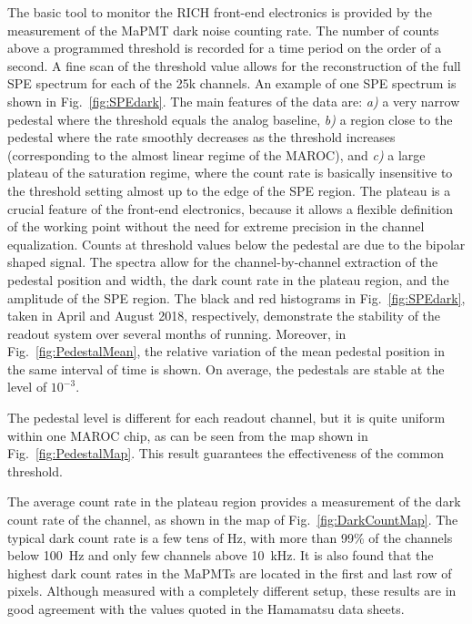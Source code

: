 \documentclass[5p,times,twocolumn]{elsarticle}
\begin{document}
The basic tool to monitor the RICH front-end electronics is provided by the measurement of the MaPMT dark noise
counting rate. The number of counts above a programmed
threshold is recorded for a time period on the order of a second. A fine scan of the threshold value allows for the
reconstruction of the full SPE spectrum for each of the 25k channels. An example of one SPE spectrum is shown in
Fig.~\ref{fig:SPEdark}. The main features of the data are: {\it{a)}} a very narrow pedestal where the threshold equals
the analog baseline,  {\it{b)}} a region close to the pedestal where the rate smoothly decreases as the threshold increases
(corresponding to the almost linear regime of the MAROC), and  {\it{c)}} a large plateau of the saturation regime, where
the count rate is basically insensitive to the threshold setting almost up to the edge of the SPE region. The plateau is a
crucial feature of the front-end electronics, because it allows a flexible definition of the working point without the need
for extreme precision in the channel equalization. Counts at threshold values below the pedestal are due to the bipolar 
shaped signal. The spectra allow for the channel-by-channel extraction of the 
pedestal position and width, the dark count rate in the plateau region, and the amplitude of the SPE region. The black
and red histograms in Fig.~\ref{fig:SPEdark}, taken in April and August 2018, respectively, demonstrate the stability
of the readout system over several months of running. Moreover, in Fig.~\ref{fig:PedestalMean}, the relative variation
of the mean pedestal position in the same interval of time is shown. On average, the pedestals are stable at the level of
$10^{-3}$.

The pedestal level is different for each readout channel, but it is quite uniform within one MAROC chip, as can be
seen from the map shown in Fig.~\ref{fig:PedestalMap}. This result guarantees the effectiveness of the common
threshold.

The average count rate in the plateau region provides a measurement of the dark count rate of the channel, as shown
in the map of Fig.~\ref{fig:DarkCountMap}. The typical dark count rate is a few tens of Hz, with more than 99\% of
the channels below 100~Hz and only few channels above 10~kHz. It is also found that the highest dark count rates in
the MaPMTs are located in the first and last row of pixels. Although measured with a completely different setup,
these results are in good agreement with the values quoted in the Hamamatsu data sheets.
\end{document}
